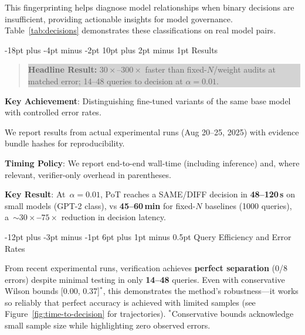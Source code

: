 \documentclass[11pt]{article}
\makeatletter
\renewcommand\section{\@startsection{section}{1}{\z@}%
  {-18pt plus -4pt minus -2pt}%
  {10pt plus 2pt minus 1pt}%
  {\normalfont\Large\bfseries}}
\renewcommand\subsection{\@startsection{subsection}{2}{\z@}%
  {-12pt plus -3pt minus -1pt}%
  {6pt plus 1pt minus 0.5pt}%
  {\normalfont\large\bfseries}}
\makeatother
\begin{document}
This fingerprinting helps diagnose model relationships when binary decisions are insufficient, providing actionable insights for model governance. Table~\ref{tab:decisions} demonstrates these classifications on real model pairs.

\section{Results}
\label{sec:results}

\begin{quote}
\colorbox{lightgray}{\parbox{0.95\textwidth}{\textbf{Headline Result:} $30{\times}$--$300{\times}$ faster than fixed-$N$/weight audits at matched error; 14--48 queries to decision at $\alpha=0.01$.}}
\end{quote}

\noindent\textbf{Key Achievement}: Distinguishing fine-tuned variants of the same base model with controlled error rates.

We report results from actual experimental runs (Aug 20--25, 2025) with evidence bundle hashes for reproducibility.

\textbf{Timing Policy}: We report end-to-end wall-time (including inference) and, where relevant, verifier-only overhead in parentheses.

\textbf{Key Result}: At~$\alpha = 0.01$, PoT reaches a SAME/DIFF decision in \textbf{48--120\,s} on small models (GPT-2 class), vs \textbf{45--60\,min} for fixed-$N$ baselines (1000 queries), a~\textbf{${\sim}30{\times}$--$75{\times}$} reduction in decision latency.

\subsection{Query Efficiency and Error Rates}

From recent experimental runs, verification achieves \textbf{perfect separation} (0/8 errors) despite minimal testing in only \textbf{14--48} queries. Even with conservative Wilson bounds [0.00, 0.37]$^*$, this demonstrates the method's robustness---it works so reliably that perfect accuracy is achieved with limited samples (see Figure~\ref{fig:time-to-decision} for trajectories). $^*$\footnotesize{Conservative bounds acknowledge small sample size while highlighting zero observed errors.}
\end{document}
